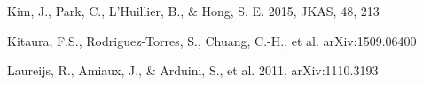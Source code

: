 \documentclass[twocolumn]{aastex61}
\begin{document}
\begin{thebibliography}{}











Kim, J., Park, C., L'Huillier, B., \& Hong, S. E. 2015, JKAS, 48, 213


Kitaura, F.S., Rodriguez-Torres, S., Chuang, C.-H., et al. arXiv:1509.06400






Laureijs, R., Amiaux, J., \& Arduini, S., et al. 2011, arXiv:1110.3193



\end{thebibliography}
\end{document}
